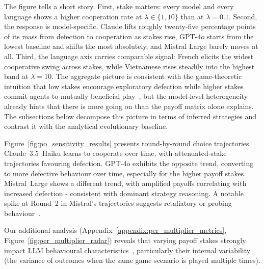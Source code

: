 \documentclass[a4paper,fleqn]{cas-sc}
\begin{document}
The figure tells a short story. First, stake matters: every model and every language shows a higher cooperation rate at $\lambda \in \{1, 10\}$ than at $\lambda = 0.1$. Second, the response is model-specific. Claude lifts roughly twenty-five percentage points of its mass from defection to cooperation as stakes rise, GPT-4o starts from the lowest baseline and shifts the most absolutely, and Mistral Large barely moves at all. Third, the language axis carries comparable signal: French elicits the widest cooperative swing across stakes, while Vietnamese rises steadily into the highest band at $\lambda = 10$. The aggregate picture is consistent with the game-theoretic intuition that low stakes encourage exploratory defection while higher stakes commit agents to mutually beneficial play~\cite{han_when_2021}, but the model-level heterogeneity already hints that there is more going on than the payoff matrix alone explains. The subsections below decompose this picture in terms of inferred strategies and contrast it with the analytical evolutionary baseline.

Figure~\ref{fig:po_sensitivity_results} presents round-by-round choice trajectories. Claude~3.5~Haiku learns to cooperate over time, with attenuated-stake trajectories favouring defection. GPT-4o exhibits the opposite trend, converting to more defective behaviour over time, especially for the higher payoff stakes. Mistral~Large shows a different trend, with amplified payoffs correlating with increased defection - consistent with dominant strategy reasoning. A notable spike at Round~2 in Mistral's trajectories suggests retaliatory or probing behaviour~\cite{akata2025}.

Our additional analysis (Appendix~\ref{appendix:per_multiplier_metrics}, Figure~\ref{fig:per_multiplier_radar}) reveals that varying payoff stakes strongly impact LLM behavioural characteristics~\cite{buscemi2025fairgame}, particularly their internal variability (the variance of outcomes when the same game scenario is played multiple times).
\end{document}
